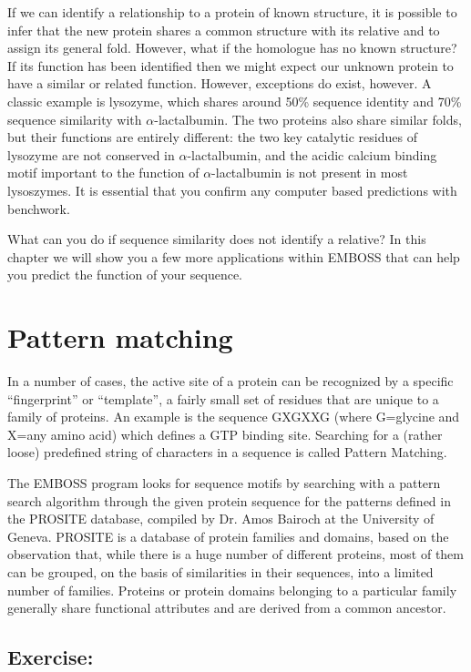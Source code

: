 \documentclass[12pt]{report}
\begin{document}
If we can identify a relationship to a protein of known structure, it
is possible to infer that the new protein shares a common structure
with its relative and to assign its general fold. However, what if the
homologue has no known structure?  If its function has been identified
then we might expect our unknown protein to have a similar or related
function. However, exceptions do exist, however. A classic example is
lysozyme, which shares around 50\% sequence identity and 70\% sequence
similarity with $\alpha$-lactalbumin. The two proteins also share
similar folds, but their functions are entirely different: the two key
catalytic residues of lysozyme are not conserved in
$\alpha$-lactalbumin, and the acidic calcium binding motif important
to the function of $\alpha$-lactalbumin is not present in most
lysoszymes. It is essential that you confirm any computer based
predictions with benchwork.

What can you do if sequence similarity does not identify a relative?
In this chapter we will show you a few more applications within EMBOSS
that can help you predict the function of your sequence.

\section{Pattern matching}
In a number of cases, the active site of a protein can be recognized
by a specific ``fingerprint'' or ``template'', a fairly small set of
residues that are unique to a family of proteins. An example is the
sequence GXGXXG (where G=glycine and X=any amino acid) which defines a
GTP binding site. Searching for a (rather loose) predefined string of
characters in a sequence is called Pattern Matching. 

The EMBOSS program  looks for sequence motifs by
searching with a pattern search algorithm through the given protein
sequence for the patterns defined in the PROSITE database, compiled by
Dr. Amos Bairoch at the University of Geneva. PROSITE is a database of
protein families and domains, based on the observation that,
while there is a huge number of different proteins, most of them can
be grouped, on the basis of similarities in their sequences, into a
limited number of families. Proteins or protein domains belonging to a
particular family generally share functional attributes and are
derived from a common ancestor.

\subsection*{Exercise: }
\end{document}
